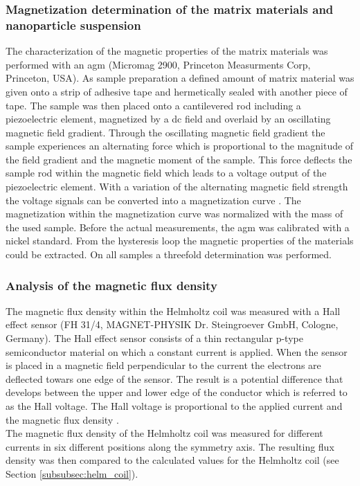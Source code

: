 \subsubsection{Magnetization determination of the matrix materials and nanoparticle suspension}
\label{subsubsec:Mag_char}
The characterization of the magnetic properties of the matrix materials was performed with an \gls{agm} (Micromag 2900, Princeton Measurments Corp, Princeton, USA). As sample preparation a defined amount of matrix material was given onto a strip of adhesive tape and hermetically sealed with another piece of tape. The sample was then placed onto a cantilevered rod including a piezoelectric element, magnetized by a dc field and overlaid by an oscillating magnetic field gradient. Through the  oscillating magnetic field gradient the sample experiences an alternating force  which is proportional to the magnitude of the field gradient and the magnetic moment of the sample. This force deflects the sample rod within the magnetic field which leads to a voltage output of the piezoelectric element. With a variation of the alternating magnetic field strength the voltage signals can be converted into a magnetization curve \cite{flanders1988alternating}. The magnetization within the magnetization curve was normalized with the mass of the used sample. Before the actual measurements, the \gls{agm} was calibrated with a nickel standard. From the hysteresis loop the magnetic properties of the materials could be extracted. On all samples a threefold determination was performed.    

\subsubsection{Analysis of the magnetic flux density}
\label{subsubsec:Hall_eff}
The magnetic flux density within the Helmholtz coil was measured with a Hall effect sensor (FH 31/4, MAGNET-PHYSIK Dr. Steingroever GmbH, Cologne, Germany). The Hall effect sensor consists of a thin rectangular p-type semiconductor material on which a constant current is applied. When the sensor is placed in a magnetic field perpendicular to the current the electrons are deflected towars one edge of the sensor. The result is a potential difference that develops between the upper and lower edge of the conductor which is referred to as the Hall voltage. The Hall voltage is proportional to the applied current and the magnetic flux density \cite{svoboda2004magnetic}.\\%
The magnetic flux density of the Helmholtz coil was measured for different currents in six different positions along the symmetry axis. The resulting flux density was then compared to the calculated values for the Helmholtz coil (see Section \ref{subsubsec:helm_coil}). 


